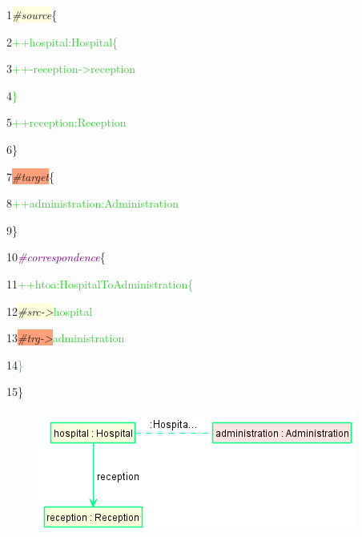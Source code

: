 {

1\hspace{0.5cm}\colorbox{LightYellow}{\textit{\#source}}\{ 

2\hspace{1cm}\textcolor{LimeGreen}{++hospital:Hospital\{}

3\hspace{1.5cm}\textcolor{LimeGreen}{++-reception->reception}

4\hspace{1cm}\textcolor{LimeGreen}{\}}

5\hspace{1cm}\textcolor{LimeGreen}{++reception:Reception}

6\hspace{0.5cm}\}

7\hspace{0.5cm}\colorbox{LightSalmon}{\textit{\#target}}\{

8\hspace{1cm}\textcolor{LimeGreen}{++administration:Administration}

9\hspace{0.5cm}\}

10\hspace{0.5cm}\textcolor{Purple}{\textit{\#correspondence}}\{

11\hspace{1cm}\textcolor{LimeGreen}{++htoa:HospitalToAdministration\{}

12\hspace{1.5cm}\colorbox{LightYellow}{\textit{\#src->}}\textcolor{LimeGreen}{hospital}

13\hspace{1.5cm}\colorbox{LightSalmon}{\textit{\#trg->}}\textcolor{LimeGreen}{administration}

14\hspace{1cm}\textcolor{LimeGreen}{\}}

15\hspace{0.5cm}\}\newline

}

\begin{figure}[h]
    \centering
    \includegraphics[scale=0.5 ]{pictures/h2a.png}
    \caption{}
    \label{TGG rule creation}
\end{figure}

